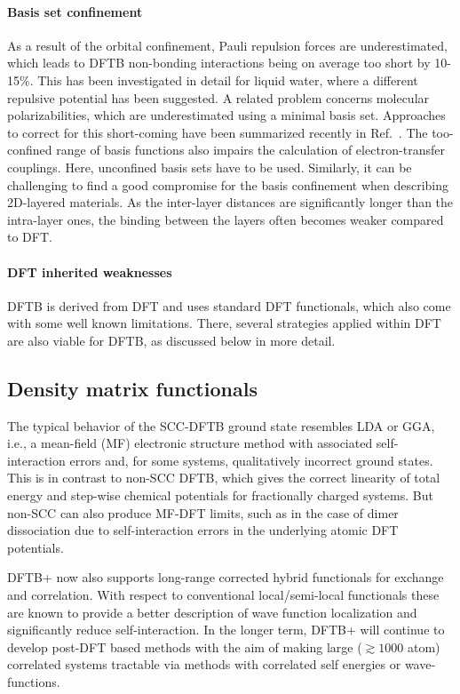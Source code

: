 \documentclass{revtex4-1}
\newcommand{\dftbp}{DFTB+}
\begin{document}
\paragraph{Basis set confinement} As a result of the orbital confinement, Pauli
repulsion forces are underestimated, which leads to DFTB non-bonding
interactions being on average too short by 10-15$\%$. This has been investigated
in detail for liquid water, where a different repulsive potential has been
suggested.\cite{Goyal2014} A related problem concerns molecular
polarizabilities, which are underestimated using a minimal basis set. Approaches
to correct for this short-coming have been summarized recently in
Ref.~. The too-confined range of basis functions
also impairs the calculation of electron-transfer couplings. Here, unconfined
basis sets have to be used.\cite{Kubas2014} Similarly, it can be challenging to
find a good compromise for the basis confinement when describing 2D-layered
materials. As the inter-layer distances are significantly longer than the
intra-layer ones, the binding between the layers often becomes weaker compared
to DFT.

\paragraph{DFT inherited weaknesses} DFTB is derived from DFT and uses standard
DFT functionals, which also come with some well known limitations. There,
several strategies applied within DFT are also viable for DFTB, as discussed
below in more detail.


\subsection{Density matrix functionals}

The typical behavior of the SCC-DFTB ground state resembles LDA or
GGA,\cite{hourahine07} i.e., a mean-field (MF) electronic structure method with
associated self-interaction errors and, for some systems, qualitatively
incorrect ground states. This is in contrast to non-SCC DFTB, which gives the
correct linearity of total energy and step-wise chemical
potentials\cite{PhysRevLett.49.1691} for fractionally charged systems. But
non-SCC can also produce MF-DFT limits, such as in the case of dimer
dissociation\cite{Rapacioli2011,Irle2012} due to self-interaction errors in the underlying
atomic DFT potentials.

\dftbp{} now also supports long-range corrected hybrid functionals for exchange
and correlation. With respect to conventional local/semi-local functionals these
are known to provide a better description of wave function localization and
significantly reduce self-interaction.\cite{Baer2010} In the longer term,
\dftbp{} will continue to develop post-DFT based methods with the aim of making
large ($\gtrsim 1000$ atom) correlated systems tractable via methods with
correlated self energies or wave-functions.
\end{document}
